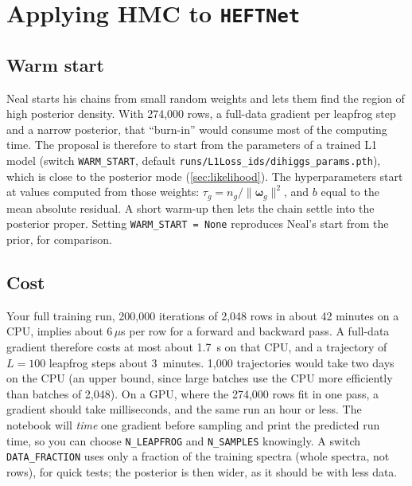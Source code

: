 \documentclass[11pt]{article}
\newcommand{\file}[1]{\nolinkurl{#1}}
\newcommand{\code}[1]{\texttt{#1}}
\newcommand{\bw}{\boldsymbol{\omega}}
\begin{document}
\section{Applying HMC to \texttt{HEFTNet}}
\label{sec:heftnet}

\subsection{Warm start}
\label{sec:warm}

Neal starts his chains from small random weights and lets them find the region of
high posterior density. With 274,000 rows, a full-data gradient per leapfrog step and
a narrow posterior, that ``burn-in'' would consume most of the computing time. The
proposal is therefore to start from the parameters of a trained L1 model (switch
\code{WARM\_START}, default \file{runs/L1Loss_ids/dihiggs_params.pth}), which is
close to the posterior mode (\cref{sec:likelihood}). The hyperparameters start at
values computed from those weights: $\tau_g = n_g/\lVert\bw_g\rVert^2$, and $b$
equal to the mean absolute residual. A short warm-up then lets the chain settle into
the posterior proper. Setting \code{WARM\_START = None} reproduces Neal's
start from the prior, for comparison.

\subsection{Cost}
\label{sec:cost}

Your full training run, 200,000 iterations of 2,048 rows in about 42 minutes on a
CPU, implies about 6\,$\mu$s per row for a forward and backward pass. A full-data
gradient therefore costs at most about 1.7~s on that CPU, and a trajectory of
$L = 100$ leapfrog steps about 3~minutes. 1,000 trajectories would take two days
on the CPU (an upper bound, since large batches use the CPU more efficiently than
batches of 2,048). On a GPU, where the 274,000 rows fit in one pass, a gradient
should take milliseconds, and the same run an hour or less. The notebook will
\emph{time} one gradient before sampling and print the predicted run time, so you
can choose \code{N\_LEAPFROG} and \code{N\_SAMPLES} knowingly. A switch
\code{DATA\_FRACTION} uses only a fraction of the training spectra (whole spectra,
not rows), for quick tests; the posterior is then wider, as it should be with less
data.
\end{document}
